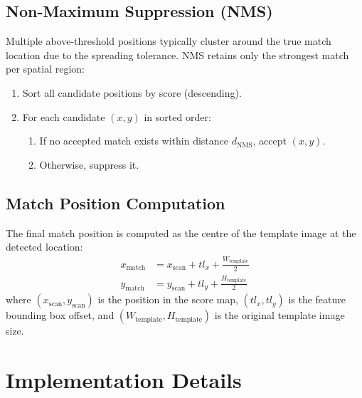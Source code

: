 \documentclass[12pt,a4paper]{article}
\begin{document}
\subsection{Non-Maximum Suppression (NMS)}
Multiple above-threshold positions typically cluster around the true match location
due to the spreading tolerance.  NMS retains only the strongest match per spatial
region:
\begin{enumerate}
  \item Sort all candidate positions by score (descending).
  \item For each candidate $(x,y)$ in sorted order:
        \begin{enumerate}
          \item If no accepted match exists within distance $d_\text{NMS}$, accept
                $(x,y)$.
          \item Otherwise, suppress it.
        \end{enumerate}
\end{enumerate}

\subsection{Match Position Computation}
The final match position is computed as the centre of the template image at the
detected location:
\begin{align}
  x_\text{match} &= x_\text{scan} + tl_x + \frac{W_\text{template}}{2} \\
  y_\text{match} &= y_\text{scan} + tl_y + \frac{H_\text{template}}{2}
\end{align}
where $(x_\text{scan}, y_\text{scan})$ is the position in the score map,
$(tl_x, tl_y)$ is the feature bounding box offset, and
$(W_\text{template}, H_\text{template})$ is the original template image size.

\section{Implementation Details}
\end{document}
